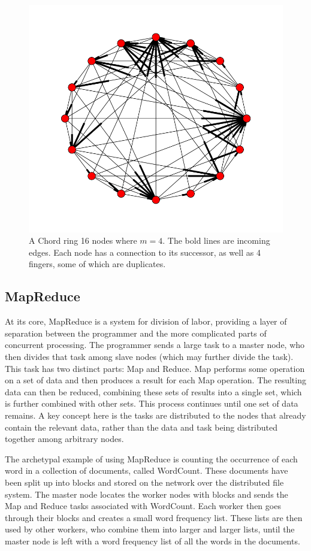 \documentclass[10pt, conference, compsocconf]{IEEEtran}
\begin{document}
\begin{figure}
    \includegraphics[width=\linewidth]{chordreal}
    \caption{A Chord ring 16 nodes where $m=4$.  The bold lines are incoming edges.  Each node has a connection to its successor, as well as 4 fingers, some of which are duplicates.}
    \label{chordreal}
\end{figure}


\subsection{MapReduce}
At its core, MapReduce \cite{mapreduce} is a system for division of labor, providing a layer of separation between the programmer and the more complicated parts of concurrent processing.  The programmer sends a large task to a master node, who then divides that task among slave nodes (which may further divide the task).  This task has two distinct parts: Map and Reduce.  Map performs some operation on a set of data and then produces a result for each Map operation.  The resulting data can then be reduced, combining these sets of results into a single set, which is further combined with other sets.  This process continues until one set of data remains.  A key concept here is the tasks are distributed to the nodes that already contain the relevant data, rather than the data and task being distributed together among arbitrary nodes.

The archetypal example of using MapReduce is counting the occurrence of each word in a collection of documents, called WordCount.  These documents have been split up into blocks and stored on the network over the distributed file system.  The master node locates the worker nodes with blocks and sends the Map and Reduce tasks associated with WordCount.  Each worker then goes through their blocks and creates a small word frequency list.  These lists are then used by other workers, who combine them into larger and larger lists, until the master node is left with a word frequency list of all the words in the documents. 
\end{document}
